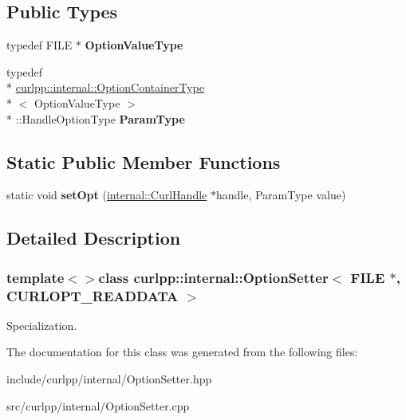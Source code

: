 \subsection*{Public Types}
\begin{DoxyCompactItemize}
\item 
\hypertarget{classcurlpp_1_1internal_1_1OptionSetter_3_01FILE_01_5_00_01CURLOPT__READDATA_01_4_a5d09255d9a020223d8461fcf4d2db5e3}{typedef F\-I\-L\-E $\ast$ {\bfseries Option\-Value\-Type}}\label{classcurlpp_1_1internal_1_1OptionSetter_3_01FILE_01_5_00_01CURLOPT__READDATA_01_4_a5d09255d9a020223d8461fcf4d2db5e3}

\item 
\hypertarget{classcurlpp_1_1internal_1_1OptionSetter_3_01FILE_01_5_00_01CURLOPT__READDATA_01_4_a513fc1729cd9d37ee614d68c9531a47a}{typedef \\*
\hyperlink{structcurlpp_1_1internal_1_1OptionContainerType}{curlpp\-::internal\-::\-Option\-Container\-Type}\\*
$<$ Option\-Value\-Type $>$\\*
\-::Handle\-Option\-Type {\bfseries Param\-Type}}\label{classcurlpp_1_1internal_1_1OptionSetter_3_01FILE_01_5_00_01CURLOPT__READDATA_01_4_a513fc1729cd9d37ee614d68c9531a47a}

\end{DoxyCompactItemize}
\subsection*{Static Public Member Functions}
\begin{DoxyCompactItemize}
\item 
\hypertarget{classcurlpp_1_1internal_1_1OptionSetter_3_01FILE_01_5_00_01CURLOPT__READDATA_01_4_a1cb34a4f4db6df020ced8712f2d6971a}{static void {\bfseries set\-Opt} (\hyperlink{classcurlpp_1_1internal_1_1CurlHandle}{internal\-::\-Curl\-Handle} $\ast$handle, Param\-Type value)}\label{classcurlpp_1_1internal_1_1OptionSetter_3_01FILE_01_5_00_01CURLOPT__READDATA_01_4_a1cb34a4f4db6df020ced8712f2d6971a}

\end{DoxyCompactItemize}


\subsection{Detailed Description}
\subsubsection*{template$<$$>$class curlpp\-::internal\-::\-Option\-Setter$<$ F\-I\-L\-E $\ast$, C\-U\-R\-L\-O\-P\-T\-\_\-\-R\-E\-A\-D\-D\-A\-T\-A $>$}

Specialization. 

The documentation for this class was generated from the following files\-:\begin{DoxyCompactItemize}
\item 
include/curlpp/internal/Option\-Setter.\-hpp\item 
src/curlpp/internal/Option\-Setter.\-cpp\end{DoxyCompactItemize}
